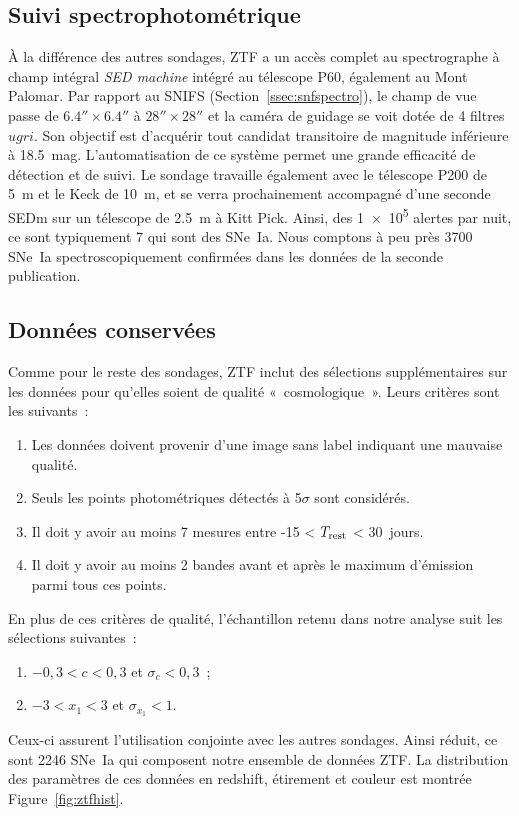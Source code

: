 \documentclass[../main/main.tex]{subfiles}
\begin{document}
\subsection{Suivi spectrophotométrique}\label{ssec:ztfspectro}

À la différence des autres sondages, ZTF a un accès complet au spectrographe à
champ intégral \textit{SED machine} \citep[SEDm, voir][]{blagorodnova2018,
rigault2019} intégré au télescope P60, également au Mont Palomar. Par rapport au
SNIFS (Section~\ref{ssec:snfspectro}), le champ de vue passe de
$\ang{;;6.4}\times\ang{;;6.4}$ à $\ang{;;28}\times\ang{;;28}$ et la caméra de
guidage se voit dotée de 4 filtres $ugri$. Son objectif est d'acquérir tout
candidat transitoire de magnitude inférieure à \SI{18.5}{mag}. L'automatisation
de ce système permet une grande efficacité de détection et de suivi. Le sondage
travaille également avec le télescope P200 de \SI{5}{m} et le Keck de
\SI{10}{m}, et se verra prochainement accompagné d'une seconde SEDm sur un
télescope de \SI{2.5}{m} à Kitt Pick. Ainsi, des \num{1e5} alertes par nuit, ce
sont typiquement 7 qui sont des SNe~Ia. Nous comptons à peu près 3700 SNe~Ia
spectroscopiquement confirmées dans les données de la seconde publication.

\subsection{Données conservées}\label{ssec:ztfdata}

Comme pour le reste des sondages, ZTF inclut des sélections supplémentaires sur
les données pour qu'elles soient de qualité «~cosmologique~». Leurs critères
sont les suivants~:
\begin{enumerate}
    \item Les données doivent provenir d'une image sans label indiquant une
        mauvaise qualité.
    \item Seuls les points photométriques détectés à 5$\sigma$ sont considérés.
    \item Il doit y avoir au moins 7 mesures entre -15 < $T_{\rm rest}$ <
      \SI{30}{jours}.
    \item Il doit y avoir au moins 2 bandes avant et après le maximum d'émission
      parmi tous ces points.
\end{enumerate}
En plus de ces critères de qualité, l'échantillon retenu dans notre analyse suit
les sélections suivantes~:
\begin{enumerate}[resume]
    \item $-0,3 < c < 0,3$ et $\sigma_{c} < 0,3$~;
    \item $-3 < x_1 < 3$ et $\sigma_{x_1} < 1$.
\end{enumerate}
Ceux-ci assurent l'utilisation conjointe avec les autres sondages. Ainsi réduit,
ce sont 2246 SNe~Ia qui composent notre ensemble de données ZTF. La distribution
des paramètres de ces données en redshift, étirement et couleur est montrée
Figure~\ref{fig:ztfhist}.
\end{document}
